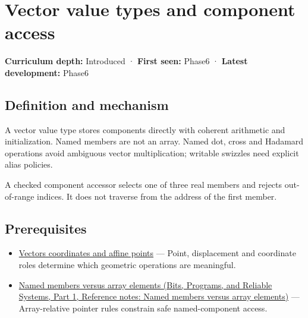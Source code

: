\hypertarget{appendix-37a39984ba66}{}\label{referencestart:appendix-37a39984ba66}
\section{Vector value types and component access}\label{appendix-37a39984ba66-vector-value-types-and-component-access}

\hypertarget{appendix-37a39984ba66-vector-value-types-and-component-access}{}

\textbf{Curriculum depth:} Introduced · \textbf{First seen:} Phase6 · \textbf{Latest development:} Phase6

\begin{allmightroledefinition}

\subsection{Definition and mechanism}\label{appendix-37a39984ba66-definition-and-mechanism}

\hypertarget{appendix-37a39984ba66-definition-and-mechanism}{}

A vector value type stores components directly with coherent arithmetic and initialization. Named members are not an array. Named dot, cross and Hadamard operations avoid ambiguous vector multiplication; writable swizzles need explicit alias policies.

\end{allmightroledefinition}

A checked component accessor selects one of three real members and rejects out-of-range indices. It does not traverse from the address of the first member.

\subsection{Prerequisites}\label{appendix-37a39984ba66-prerequisites}

\hypertarget{appendix-37a39984ba66-prerequisites}{}

\begin{itemize}
\tightlist
\item
  \hyperref[appendix-0659864c0aa3]{Vectors coordinates and affine points} --- Point, displacement and coordinate roles determine which geometric operations are meaningful.
\item
  \href{../01-Bits-Programs-and-Reliable-Systems-P01/main.pdf\#appendix-3f7e15effba6}{Named members versus array elements (Bits, Programs, and Reliable Systems, Part 1, Reference notes: Named members versus array elements)} --- Array-relative pointer rules constrain safe named-component access.
\end{itemize}

